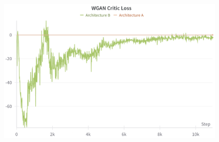 \documentclass{article}
\begin{document}
\begin{figure}[ht]
\begin{minipage}[b]{0.45\textwidth}
        \label{fig:image3}
    \end{minipage}
    \hfill
    \begin{minipage}[b]{0.45\textwidth}
        \centering
        \includegraphics[width=\textwidth]{../src/wgan_crit_loss.png}
        \label{fig:image4}
    \end{minipage}


\end{figure}
\end{document}
